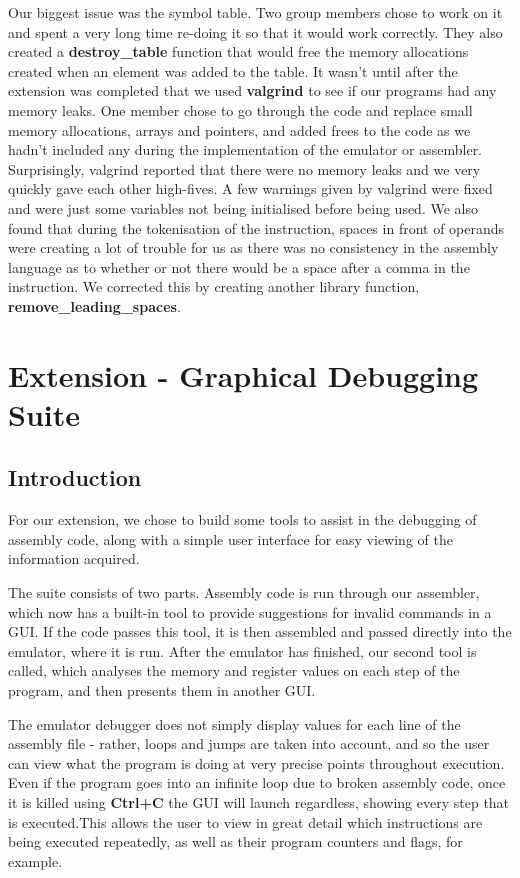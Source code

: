 \documentclass[11pt]{article}
\begin{document}
Our biggest issue was the symbol table. Two group members chose to work on it and spent a very long time re-doing it so that it would work correctly. They also created a {\bf destroy\_table} function that would free the memory allocations created when an element was added to the table. It wasn't until after the extension was completed that we used {\bf valgrind} to see if our programs had any memory leaks. One member chose to go through the code and replace small memory allocations, arrays and pointers, and added frees to the code as we hadn't included any during the implementation of the emulator or assembler. Surprisingly, valgrind reported that there were no memory leaks and we very quickly gave each other high-fives. A few warnings given by valgrind were fixed and were just some variables not being initialised before being used. We also found that during the tokenisation of the instruction, spaces in front of operands were creating a lot of trouble for us as there was no consistency in the assembly language as to whether or not there would be a space after a comma in the instruction. We corrected this by creating another library function, {\bf remove\_leading\_spaces}.

\section{Extension - Graphical Debugging Suite}
\subsection{Introduction}
For our extension, we chose to build some tools to assist in the debugging of assembly code, along with a simple user interface for easy viewing of the information acquired.

The suite consists of two parts. Assembly code is run through our assembler, which now has a built-in tool to provide suggestions for invalid commands in a GUI. If the code passes this tool, it is then assembled and passed directly into the emulator, where it is run. After the emulator has finished, our second tool is called, which analyses the memory and register values on each step of the program, and then presents them in another GUI. 

The emulator debugger does not simply display values for each line of the assembly file - rather, loops and jumps are taken into account, and so the user can view what the program is doing at very precise points throughout execution. Even if the program goes into an infinite loop due to broken assembly code, once it is killed using {\bf Ctrl+C} the GUI will launch regardless, showing every step that is executed.This allows the user to view in great detail which instructions are being executed repeatedly, as well as their program counters and flags, for example.
\end{document}

